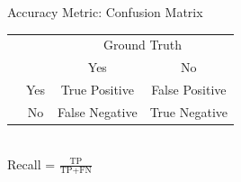\documentclass[usenames,dvipsnames]{beamer}
\begin{document}
\begin{frame}{Accuracy Metric: Confusion Matrix}
\begin{center}
	\begin{tabular}{@{}cc cc@{}}
		\multicolumn{1}{c}{} &\multicolumn{1}{c}{} &\multicolumn{2}{c}{Ground Truth} \\ 
		\cmidrule(lr){3-4}
		\multicolumn{1}{c}{} & 
		\multicolumn{1}{c}{} & 
		\multicolumn{1}{c}{Yes} & 
		\multicolumn{1}{c}{No} \\ 
		\cline{2-4}
		\multirow[c]{2}{*}{\rotatebox[origin=tr]{90}{Predicted}}
		
		& Yes  & \cellcolor{blue!50}True Positive &False Positive   \\[1.5ex]
		& No  &  \cellcolor{blue!25}False Negative   & True Negative \\ 
		\cline{2-4}
	\end{tabular}\\
	
	\vspace{30pt}
	Recall = $\frac{\text{TP}}{\text{TP} + \text{FN}}$
\end{center}
\end{frame}


%
%
\end{document}
